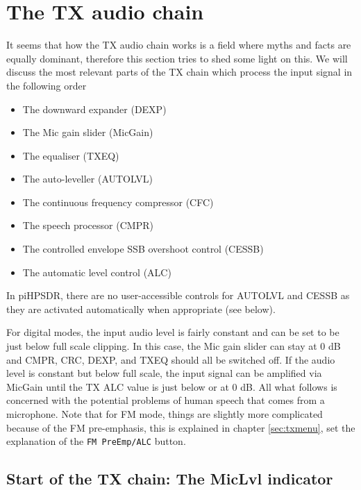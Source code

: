 \documentclass[12pt]{book}
\def\rett#1{\texttt{\color{red}#1}}
\def\pH{pi\-HPSDR\xspace}
\begin{document}
\section{The TX audio chain}
\label{sec:txchain}
It seems that how the TX audio chain works is a field where myths and facts are equally dominant, therefore
this section tries to shed some light on this. We will discuss the most relevant parts of the TX
chain which process the input signal in the following order

\begin{itemize}
\item{The downward expander (DEXP)}
\item{The Mic gain slider (MicGain)}
\item{The equaliser (TXEQ)}
\item{The auto-leveller (AUTOLVL)}
\item{The continuous frequency compressor (CFC)}
\item{The speech processor (CMPR)}
\item{The controlled envelope SSB overshoot control (CESSB)}
\item{The automatic level control (ALC)}
\end{itemize}

In \pH, there are no user-accessible controls for AUTOLVL and CESSB as they are activated
automatically when appropriate (see below).

For digital modes, the input audio level is fairly constant and can be set to be just below full scale
clipping. In this case, the Mic gain slider can stay at 0 dB and CMPR, CRC, DEXP, and TXEQ should
all be switched off. If the audio level is constant but below full scale, the input signal can be
amplified via MicGain until the TX ALC value is just below or at 0 dB.
All what follows is concerned with the potential problems of human speech
that comes from a microphone. Note that for FM mode, things are slightly more complicated
because of the FM pre-emphasis, this is explained in chapter \ref{sec:txmenu}, set the
explanation of the \rett{FM PreEmp/ALC} button.

\subsection{Start of the TX chain: The MicLvl indicator}
\end{document}
